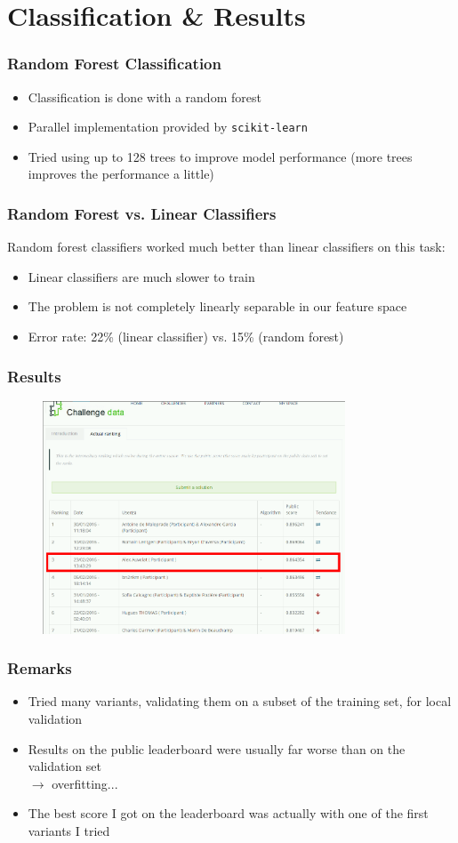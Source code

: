 \documentclass{beamer}
\begin{document}
\section{Classification & Results}
\frame{\sectionpage}

\begin{frame}
	\frametitle{Random Forest Classification}
	\begin{itemize}
		\item Classification is done with a random forest
		\item Parallel implementation provided by \texttt{scikit-learn}
		\item Tried using up to 128 trees to improve model performance (more trees improves the performance a little)
	\end{itemize}
\end{frame}

\begin{frame}
	\frametitle{Random Forest vs. Linear Classifiers}
	Random forest classifiers worked much better than linear classifiers on this task:
	\begin{itemize}
		\item Linear classifiers are much slower to train
		\item The problem is not completely linearly separable in our feature space
		\item Error rate: 22\% (linear classifier) vs. 15\% (random forest)
	\end{itemize}
\end{frame}

\begin{frame}
	\frametitle{Results}
	\begin{figure}
		\centering
		\includegraphics[width=9cm]{../CLASSMENT.png}
	\end{figure}
\end{frame}

\begin{frame}
	\frametitle{Remarks}
	\begin{itemize}
		\item Tried many variants, validating them on a subset of the training set, for local validation
		\item Results on the public leaderboard were usually far worse than on the validation set\\
		$\to$ overfitting...
		\item The best score I got on the leaderboard was actually with one of the first variants I tried

	\end{itemize}
\end{frame}
\end{document}

